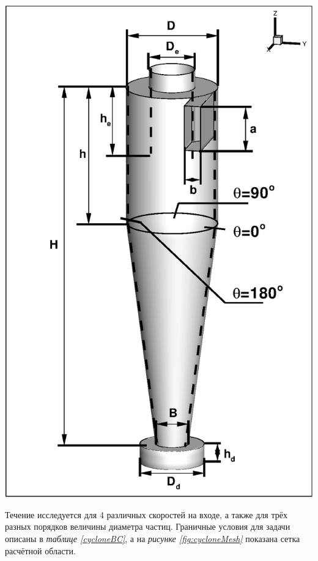   \begin{minipage}{0.35\textwidth}
    \includegraphics[scale=0.45]{cycloneGeometryTeta}
	\label{fig:cycloneGeometryScheme}
  \end{minipage}
  \vspace{1em}
	
	Течение исследуется для 4 различных скоростей на входе, а также для трёх разных порядков величины диаметра частиц. Граничные условия для задачи описаны в \textit{таблице \ref{cycloneBC}}, а на \textit{рисунке \ref{fig:cycloneMesh}} показана сетка расчётной области.
	
